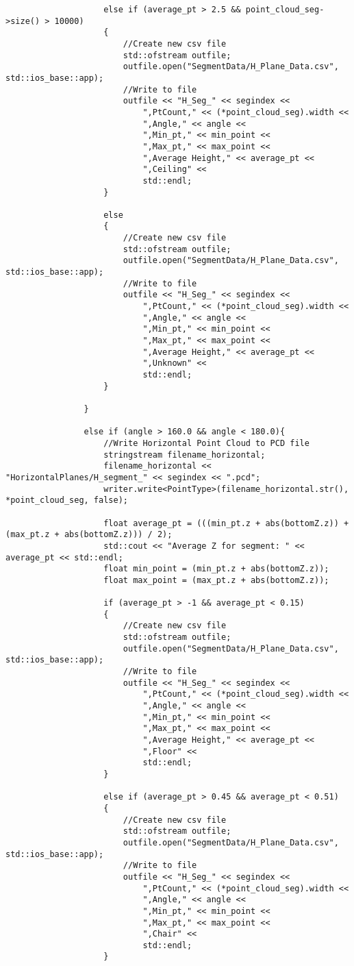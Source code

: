 \begin{lstlisting}
					else if (average_pt > 2.5 && point_cloud_seg->size() > 10000)
					{
						//Create new csv file
						std::ofstream outfile;
						outfile.open("SegmentData/H_Plane_Data.csv", std::ios_base::app);
						//Write to file
						outfile << "H_Seg_" << segindex <<
							",PtCount," << (*point_cloud_seg).width <<
							",Angle," << angle <<
							",Min_pt," << min_point <<
							",Max_pt," << max_point <<
							",Average Height," << average_pt <<
							",Ceiling" <<
							std::endl;
					}

					else
					{
						//Create new csv file
						std::ofstream outfile;
						outfile.open("SegmentData/H_Plane_Data.csv", std::ios_base::app);
						//Write to file
						outfile << "H_Seg_" << segindex <<
							",PtCount," << (*point_cloud_seg).width <<
							",Angle," << angle <<
							",Min_pt," << min_point <<
							",Max_pt," << max_point <<
							",Average Height," << average_pt <<
							",Unknown" << 
							std::endl;
					}

				}

				else if (angle > 160.0 && angle < 180.0){
					//Write Horizontal Point Cloud to PCD file
					stringstream filename_horizontal;
					filename_horizontal << "HorizontalPlanes/H_segment_" << segindex << ".pcd";
					writer.write<PointType>(filename_horizontal.str(), *point_cloud_seg, false);

					float average_pt = (((min_pt.z + abs(bottomZ.z)) + (max_pt.z + abs(bottomZ.z))) / 2);
					std::cout << "Average Z for segment: " << average_pt << std::endl;
					float min_point = (min_pt.z + abs(bottomZ.z));
					float max_point = (max_pt.z + abs(bottomZ.z));

					if (average_pt > -1 && average_pt < 0.15)
					{
						//Create new csv file
						std::ofstream outfile;
						outfile.open("SegmentData/H_Plane_Data.csv", std::ios_base::app);
						//Write to file
						outfile << "H_Seg_" << segindex <<
							",PtCount," << (*point_cloud_seg).width <<
							",Angle," << angle <<
							",Min_pt," << min_point <<
							",Max_pt," << max_point <<
							",Average Height," << average_pt <<
							",Floor" <<
							std::endl;
					}

					else if (average_pt > 0.45 && average_pt < 0.51)
					{
						//Create new csv file
						std::ofstream outfile;
						outfile.open("SegmentData/H_Plane_Data.csv", std::ios_base::app);
						//Write to file
						outfile << "H_Seg_" << segindex <<
							",PtCount," << (*point_cloud_seg).width <<
							",Angle," << angle <<
							",Min_pt," << min_point <<
							",Max_pt," << max_point <<
							",Chair" <<
							std::endl;
					}


\end{lstlisting}
